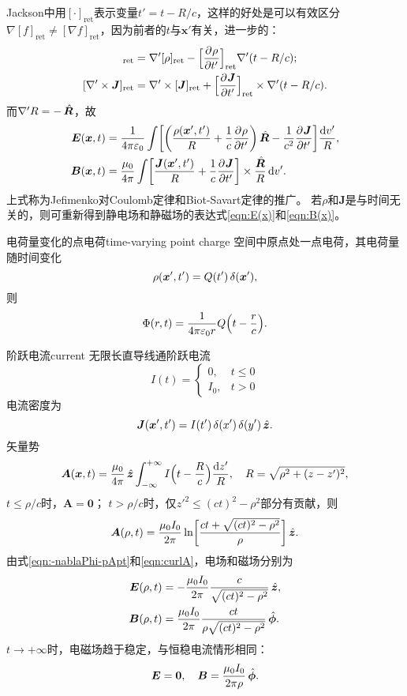 Jackson中用$[\cdot]_\text{ret}$表示变量$t'=t-R/c$，这样的好处是可以有效区分$\nabla[f]_\text{ret}\neq[\nabla f]_\text{ret}$，因为前者的$t$与$\bm x'$有关，进一步的：
\begin{align*}
    [\nabla'\rho]_\text{ret}&=\nabla'[\rho]_\text{ret}-\Bigfkh{\pv\rho{t'}}_\text{ret}\nabla'(t-R/c);\\
    [\nabla'\times\bm J]_\text{ret}&=\nabla'\times[\bm J]_\text{ret}+\Bigfkh{\pv{\bm J}{t'}}_\text{ret}\times\nabla'(t-R/c).
\end{align*}
而$\nabla'R=-\mathop{}\!\hat{\bm{R}}$，故
\begin{align}
    \bm E(\bm x,t)&=\frac1{4\pi\varepsilon_0}\int\biggl[\biggl(\frac{\rho(\bm x',t')}R+\frac1c\frac{\partial^{{}}\rho}{\partial{t'}^{{}}}\biggr)\mathop{}\!\hat{\bm{R}}-\frac1{c^2}\frac{\partial^{{}}\bm J}{\partial{t'}^{{}}}\biggr]\frac{\mathop{}\!\mathrm{d} v'}R,\\
    \bm B(\bm x,t)&=\frac{\mu_0}{4\pi}\int\biggl[\frac{\bm J(\bm x',t')}R+\frac1c\frac{\partial^{{}}\bm J}{\partial{t'}^{{}}}\biggr]\times\frac{\hat{\bm{R}}}R\mathop{}\!\mathrm{d} v'.
\end{align}
上式称为Jefimenko对Coulomb定律和Biot-Savart定律的推广。
若$\rho$和$\bm J$是与时间无关的，则可重新得到静电场和静磁场的表达式\eqref{eqn:E(x)}和\eqref{eqn:B(x)}。
\begin{example}{电荷量变化的点电荷}{time-varying point charge}
    空间中原点处一点电荷，其电荷量随时间变化
    \[
        \rho(\bm x',t')=Q(t')\mathop{}\!\delta(\bm x'),
    \]
    则
    \[
        \Phi(r,t)=\frac1{4\pi\varepsilon_0r}Q\Bigl(t-\frac rc\Bigr).
    \]
\end{example}
\begin{example}{阶跃电流}{current}
    无限长直导线通阶跃电流
    \[
        I(t)=\begin{cases}
            0,&t\leqslant 0\\
            I_0,&t>0
        \end{cases}
    \]
    电流密度为
    \[
        \bm J(\bm x',t')=I(t')\mathop{}\!\delta(x')\mathop{}\!\delta(y')\mathop{}\!\hat{\bm{z}}.
    \]
    矢量势
    \[
        \bm A(\bm x,t)=\frac{\mu_0}{4\pi}\mathop{}\!\hat{\bm{z}}\int_{-\infty}^{+\infty} I\Bigl(t-\frac Rc\Bigr)\frac{\mathop{}\!\mathrm{d} z'}R,\quad R=\sqrt{\rho^2+(z-z')^2},
    \]
    $t\leqslant\rho/c$时，$\bm A=\bm 0$；
    $t>\rho/c$时，仅$z'^2\leqslant(ct)^2-\rho^2$部分有贡献，则
    \[
        \bm A(\rho,t)=\frac{\mu_0I_0}{2\pi}\ln\biggl[\frac{ct+\sqrt{(ct)^2-\rho^2}}{\rho}\biggr]\mathop{}\!\hat{\bm{z}}.
    \]
    由式\eqref{eqn:-nablaPhi-pApt}和\eqref{eqn:curlA}，电场和磁场分别为
    \begin{align*}
        \bm E(\rho,t)&=-\frac{\mu_0I_0}{2\pi}\frac c{\sqrt{(ct)^2-\rho^2}}\mathop{}\!\hat{\bm{z}},\\
        \bm B(\rho,t)&=\frac{\mu_0I_0}{2\pi}\frac{ct}{\rho\sqrt{(ct)^2-\rho^2}}\mathop{}\!\hat{\bm{\phi}}.
    \end{align*}
    $t\to+\infty$时，电磁场趋于稳定，与恒稳电流情形相同：
    \[
        \bm E=\bm 0,\quad\bm B=\frac{\mu_0I_0}{2\pi\rho}\mathop{}\!\hat{\bm{\phi}}.
    \]
\end{example}
